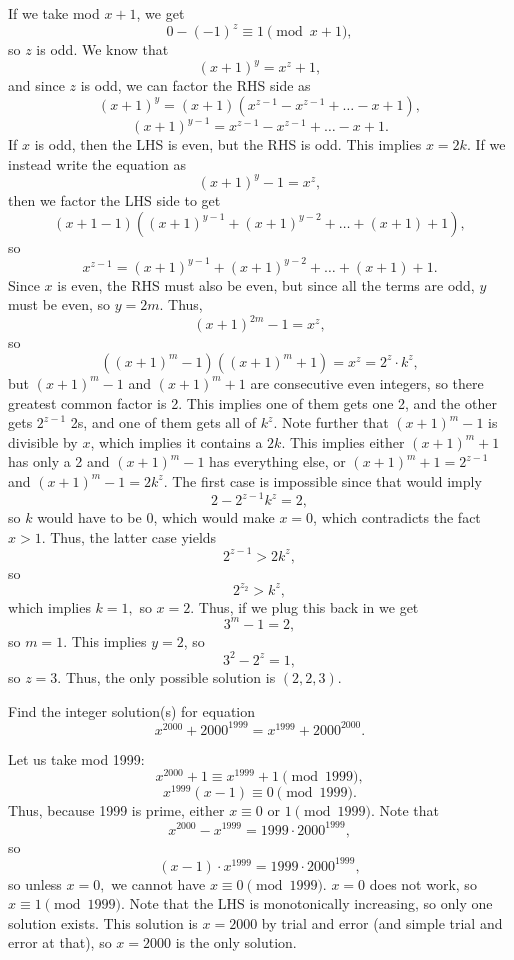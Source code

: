 \documentclass{article}
\begin{document}
\begin{sol}
If we take mod $x+1$, we get
$$0 - (-1)^z \equiv 1 \pmod{x+1},$$
so $z$ is odd. We know that
$$(x+1)^y = x^z+1,$$
and since $z$ is odd, we can factor the RHS side as
$$(x+1)^y = (x+1)(x^{z-1} - x^{z-1} + \ldots - x + 1),$$
$$(x+1)^{y-1} = x^{z-1} - x^{z-1} + \ldots - x + 1.$$
If $x$ is odd, then the LHS is even, but the RHS is odd. This implies $x=2k$. If we instead write the equation as
$$(x+1)^y - 1 = x^z,$$
then we factor the LHS side to get
$$(x+1 - 1)((x+1)^{y-1} + (x+1)^{y-2} + \ldots + (x+1) + 1),$$
so
$$x^{z-1} = (x+1)^{y-1} + (x+1)^{y-2} + \ldots + (x+1) + 1.$$
Since $x$ is even, the RHS must also be even, but since all the terms are odd, $y$ must be even, so $y=2m$. Thus,
$$(x+1)^{2m} - 1 = x^z,$$
so
$$((x+1)^m - 1)((x+1)^m + 1) = x^z = 2^z \cdot k^z,$$
but $(x+1)^m - 1$ and $(x+1)^m + 1$ are consecutive even integers, so there greatest common factor is 2. This implies one of them gets one 2, and the other gets $2^{z-1}$ 2s, and one of them gets all of $k^z$. Note further that $(x+1)^m - 1$ is divisible by $x$, which implies it contains a $2k$. This implies either $(x+1)^m + 1$ has only a 2 and $(x+1)^m - 1$ has everything else, or $(x+1)^m + 1 = 2^{z-1}$ and $(x+1)^m - 1 = 2k^z$. The first case is impossible since that would imply
$$2 - 2^{z-1} k^z = 2,$$
so $k$ would have to be 0, which would make $x=0$, which contradicts the fact $x>1$. Thus, the latter case yields
$$2^{z-1} > 2k^z,$$
so
$$2^{z_2} > k^z,$$
which implies $k=1,$ so $x=2$. Thus, if we plug this back in we get
$$3^m - 1 = 2,$$
so $m=1$. This implies $y=2$, so
$$3^2 - 2^z = 1,$$
so $z=3$. Thus, the only possible solution is $(2,2,3)$. 
\end{sol}
\begin{exam}[Poland MO] 
Find the integer solution(s) for equation 
$$x^{2000} + 2000^{1999} = x^{1999} + 2000^{2000}.$$
\end{exam}
\begin{sol}
Let us take mod 1999:
$$x^{2000} + 1 \equiv x^{1999} + 1 \pmod{1999},$$
$$x^{1999} (x-1) \equiv 0 \pmod{1999}.$$
Thus, because 1999 is prime, either $x \equiv 0$ or $1 \pmod{1999}$. Note that
$$x^{2000} - x^{1999} = 1999 \cdot 2000^{1999},$$
so 
$$(x-1) \cdot x^{1999} = 1999 \cdot 2000^{1999},$$
so unless $x=0,$ we cannot have $x\equiv 0 \pmod{1999}$. $x=0$ does not work, so $x\equiv 1\pmod{1999}$. Note that the LHS is monotonically increasing, so only one solution exists. This solution is $x=2000$ by trial and error (and simple trial and error at that), so $x=2000$ is the only solution.
\end{sol}
\problems
{}
\end{document}

